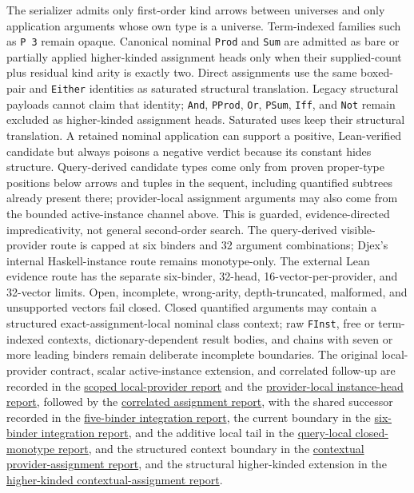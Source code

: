 \documentclass[11pt,oneside]{article}
\newcommand{\code}[1]{\texttt{#1}}
\begin{document}
The serializer admits only first-order kind arrows between universes and only
application arguments whose own type is a universe. Term-indexed families such
as \code{P 3} remain opaque. Canonical nominal \code{Prod} and \code{Sum} are
admitted as bare or partially applied higher-kinded assignment heads only when
their supplied-count plus residual kind arity is exactly two. Direct
assignments use the same boxed-pair and \code{Either} identities as saturated
structural translation. Legacy structural payloads cannot claim that identity;
\code{And}, \code{PProd}, \code{Or}, \code{PSum}, \code{Iff}, and \code{Not}
remain excluded as higher-kinded assignment heads. Saturated uses keep their
structural translation. A retained nominal application can support a
positive, Lean-verified candidate but always poisons a negative verdict because
its constant hides structure. Query-derived candidate types come only from
proven proper-type positions below arrows and tuples in the sequent, including
quantified subtrees already present there; provider-local assignment arguments
may also come from the bounded active-instance channel above. This is guarded,
evidence-directed impredicativity, not general second-order search. The
query-derived visible-provider route is capped at six binders and 32 argument
combinations; Djex's internal Haskell-instance route remains monotype-only. The
external Lean evidence route has the separate six-binder, 32-head,
16-vector-per-provider, and 32-vector limits. Open, incomplete, wrong-arity,
depth-truncated, malformed, and unsupported vectors fail closed. Closed
quantified arguments may contain a structured exact-assignment-local nominal
class context; raw \code{FInst}, free or term-indexed contexts,
dictionary-dependent result bodies, and chains with seven or more leading
binders remain deliberate incomplete boundaries. The
original local-provider contract, scalar active-instance extension, and correlated
follow-up are recorded in the
\href{reports/2026-08-01-scoped-quantified-local-providers.md}{scoped
local-provider report} and the
\href{reports/2026-08-05-provider-local-instance-head-evidence.md}{provider-local
instance-head report}, followed by the
\href{reports/2026-08-05-correlated-instance-head-assignments.md}{correlated
assignment report}, with the shared successor recorded in the
\href{reports/2026-08-09-five-binder-instantiation.md}{five-binder integration
report}, the current boundary in the
\href{reports/2026-08-10-six-binder-instantiation.md}{six-binder integration
report}, and the additive local tail in the
\href{reports/2026-08-09-query-local-closed-monotype-instantiation.md}{query-local
closed-monotype report}, and the structured context boundary in the
\href{reports/2026-08-09-contextual-provider-assignments.md}{contextual
provider-assignment report}, and the structural higher-kinded extension in the
\href{reports/2026-08-10-higher-kinded-contextual-assignments.md}{higher-kinded
contextual-assignment report}.
\end{document}
